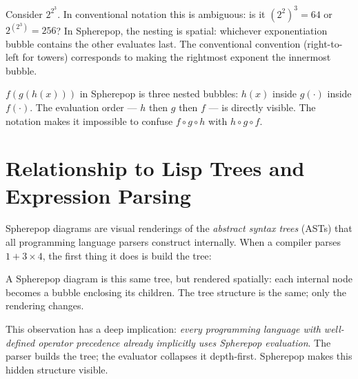 \begin{example}[title={Nested exponentiation}]
  Consider $2^{2^3}$. In conventional notation this is ambiguous:
  is it $(2^2)^3 = 64$ or $2^{(2^3)} = 256$? In Spherepop, the
  nesting is spatial: whichever exponentiation bubble contains the other
  evaluates last. The conventional convention (right-to-left for towers)
  corresponds to making the rightmost exponent the innermost bubble.
\end{example}

\begin{example}[title={Function composition}]
  $f(g(h(x)))$ in Spherepop is three nested bubbles: $h(x)$ inside
  $g(\cdot)$ inside $f(\cdot)$. The evaluation order — $h$ then $g$
  then $f$ — is directly visible. The notation makes it impossible to
  confuse $f \circ g \circ h$ with $h \circ g \circ f$.
\end{example}

\section{Relationship to Lisp Trees and Expression Parsing}


Spherepop diagrams are visual renderings of the \emph{abstract syntax trees}
(ASTs) that all programming language parsers construct internally. When a
compiler parses $1 + 3 \times 4$, the first thing it does is build the tree:

\medskip
\begin{center}
\end{center}
\medskip

A Spherepop diagram is this same tree, but rendered spatially: each internal
node becomes a bubble enclosing its children. The tree structure is the same;
only the rendering changes.

This observation has a deep implication: \emph{every programming language
with well-defined operator precedence already implicitly uses Spherepop
evaluation}. The parser builds the tree; the evaluator collapses it
depth-first. Spherepop makes this hidden structure visible.

